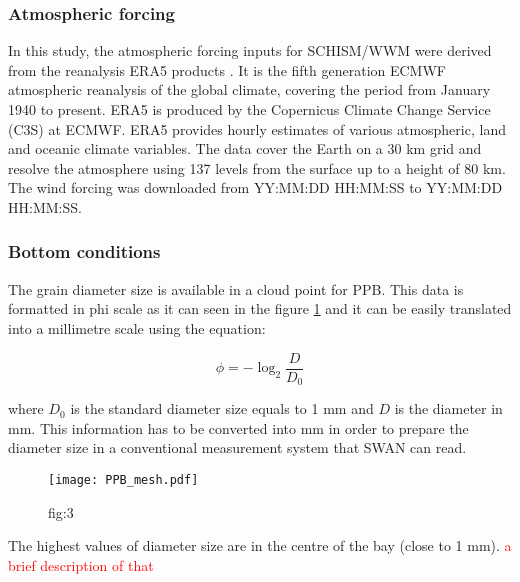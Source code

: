\documentclass[12pt]{article}
\begin{document}

\subsubsection*{Atmospheric forcing}

In this study, the atmospheric forcing inputs for SCHISM/WWM were derived from the reanalysis ERA5 products \parencite{Hersbach2019}. It is the fifth generation ECMWF atmospheric reanalysis of the global climate, covering the period from January 1940 to present. ERA5 is produced by the Copernicus Climate Change Service (C3S) at ECMWF. ERA5 provides hourly estimates of various atmospheric, land and oceanic climate variables. The data cover the Earth on a 30 km grid and resolve the atmosphere using 137 levels from the surface up to a height of 80 km. The wind forcing was downloaded from YY:MM:DD HH:MM:SS to YY:MM:DD HH:MM:SS.

\subsubsection*{Bottom conditions}

The grain diameter size is available in a cloud point for PPB. This data is formatted in phi scale as it can seen in the figure \ref{fig:phi_and_mm_scale} and it can be easily translated into a millimetre scale using the equation:

\begin{equation}
    \phi = - \log_{2}\frac{D}{D_0}
\end{equation}

where $D_0$ is the standard diameter size equals to 1 mm and $D$ is the diameter in mm. This information has to be converted into mm in order to prepare the diameter size in a conventional measurement system that SWAN can read.

\begin{figure}[h]
    \centering
    \texttt{[image: PPB\_mesh.pdf]}
    \caption{fig:3}
    \label{fig:phi_and_mm_scale}
\end{figure}

The highest values of diameter size are in the centre of the bay (close to 1 mm). \textcolor{red}{a brief description of that}
\end{document}
